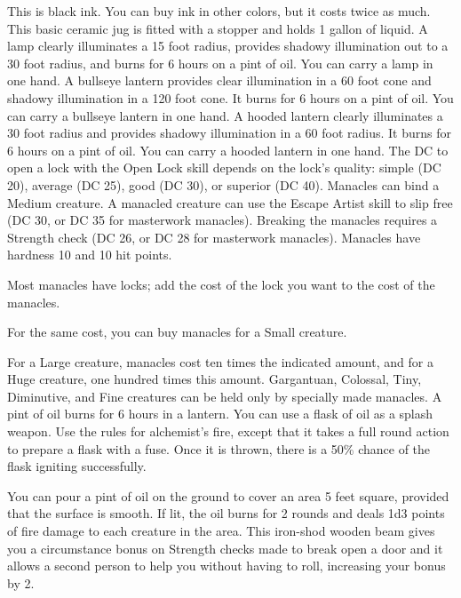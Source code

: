  This is black ink. You can buy ink in other colors, but it costs twice as much.
 This basic ceramic jug is fitted with a stopper and holds 1 gallon of liquid.
 A lamp clearly illuminates a 15 foot radius, provides shadowy illumination out to a 30 foot radius, and burns for 6 hours on a pint of oil. You can carry a lamp in one hand.
 A bullseye lantern provides clear illumination in a 60 foot cone and shadowy illumination in a 120 foot cone. It burns for 6 hours on a pint of oil. You can carry a bullseye lantern in one hand.
 A hooded lantern clearly illuminates a 30 foot radius and provides shadowy illumination in a 60 foot radius. It burns for 6 hours on a pint of oil. You can carry a hooded lantern in one hand.
 The DC to open a lock with the Open Lock skill depends on the lock's quality: simple (DC 20), average (DC 25), good (DC 30), or superior (DC 40).
 Manacles can bind a Medium creature. A manacled creature can use the Escape Artist skill to slip free (DC 30, or DC 35 for masterwork manacles). Breaking the manacles requires a Strength check (DC 26, or DC 28 for masterwork manacles). Manacles have hardness 10 and 10 hit points.
\par Most manacles have locks; add the cost of the lock you want to the cost of the manacles.
\par For the same cost, you can buy manacles for a Small creature.
\par For a Large creature, manacles cost ten times the indicated amount, and for a Huge creature, one hundred times this amount. Gargantuan, Colossal, Tiny, Diminutive, and Fine creatures can be held only by specially made manacles.
 A pint of oil burns for 6 hours in a lantern. You can use a flask of oil as a splash weapon. Use the rules for alchemist's fire, except that it takes a full round action to prepare a flask with a fuse. Once it is thrown, there is a 50\% chance of the flask igniting successfully.
\par You can pour a pint of oil on the ground to cover an area 5 feet square, provided that the surface is smooth. If lit, the oil burns for 2 rounds and deals 1d3 points of fire damage to each creature in the area.
 This iron-shod wooden beam gives you a  circumstance bonus on Strength checks made to break open a door and it allows a second person to help you without having to roll, increasing your bonus by 2.
